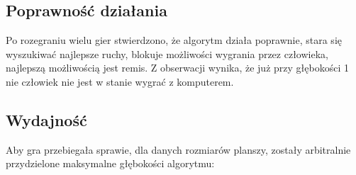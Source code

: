 \documentclass[12pt]{article}
\begin{document}
        \subsection{Poprawność działania}
            Po rozegraniu wielu gier stwierdzono, że algorytm działa poprawnie, stara się wyszukiwać najlepsze ruchy,
            blokuje możliwości wygrania przez człowieka, najlepszą możliwością jest remis.
            Z obserwacji wynika, że już przy głębokości 1 nie człowiek nie jest w stanie wygrać z komputerem.
        \subsection{Wydajność}

        Aby gra przebiegała sprawie, dla danych rozmiarów planszy, zostały arbitralnie przydzielone maksymalne głębokości algorytmu:
\end{document}
